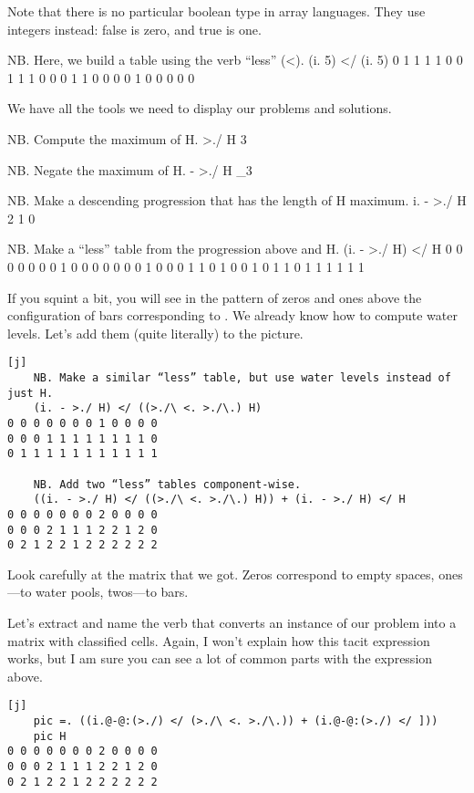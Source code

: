 \documentclass{article}
\begin{document}
Note that there is no particular boolean type in array languages.
They use integers instead: false is zero, and true is one.

\begin{code}[j]
    NB. Here, we build a table using the verb “less” (<).
    (i. 5) </ (i. 5)
0 1 1 1 1
0 0 1 1 1
0 0 0 1 1
0 0 0 0 1
0 0 0 0 0
\end{code}

We have all the tools we need to display our problems and solutions.

\begin{code}[j]
    NB. Compute the maximum of H.
    >./ H
3

    NB. Negate the maximum of H.
    - >./ H
_3

    NB. Make a descending progression that has the length of H maximum.
    i. - >./ H
2 1 0

    NB. Make a “less” table from the progression above and H.
    (i. - >./ H) </ H
0 0 0 0 0 0 0 1 0 0 0 0
0 0 0 1 0 0 0 1 1 0 1 0
0 1 0 1 1 0 1 1 1 1 1 1
\end{code}

If you squint a bit, you will see in the pattern of zeros and ones above the configuration of bars corresponding to .
We already know how to compute water levels.
Let's add them (quite literally) to the picture.

\begin{verbatim}[j]
    NB. Make a similar “less” table, but use water levels instead of just H.
    (i. - >./ H) </ ((>./\ <. >./\.) H)
0 0 0 0 0 0 0 1 0 0 0 0
0 0 0 1 1 1 1 1 1 1 1 0
0 1 1 1 1 1 1 1 1 1 1 1

    NB. Add two “less” tables component-wise.
    ((i. - >./ H) </ ((>./\ <. >./\.) H)) + (i. - >./ H) </ H
0 0 0 0 0 0 0 2 0 0 0 0
0 0 0 2 1 1 1 2 2 1 2 0
0 2 1 2 2 1 2 2 2 2 2 2
\end{verbatim}

Look carefully at the matrix that we got.
Zeros correspond to empty spaces, ones---to water pools, twos---to bars.

Let's extract and name the verb that converts an instance of our problem into a matrix with classified cells.
Again, I won't explain how this tacit expression works, but I am sure you can see a lot of common parts with the expression above.

\begin{verbatim}[j]
    pic =. ((i.@-@:(>./) </ (>./\ <. >./\.)) + (i.@-@:(>./) </ ]))
    pic H
0 0 0 0 0 0 0 2 0 0 0 0
0 0 0 2 1 1 1 2 2 1 2 0
0 2 1 2 2 1 2 2 2 2 2 2
\end{verbatim}
\end{document}
